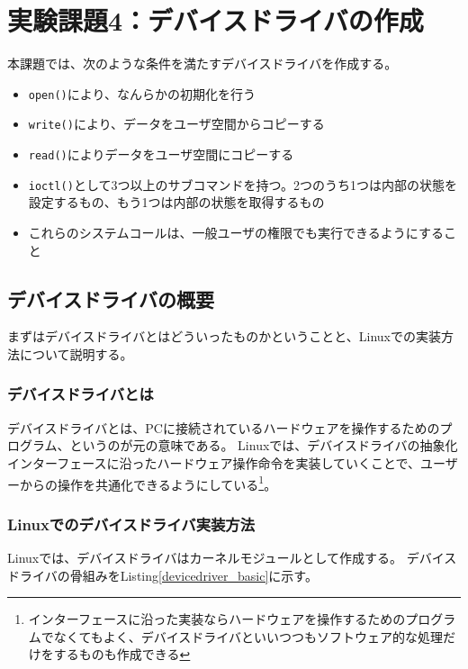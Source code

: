 \documentclass[main]{subfiles}
\begin{document}
\section{実験課題4：デバイスドライバの作成}

本課題では、次のような条件を満たすデバイスドライバを作成する。

\begin{itemize}
 \item \texttt{open()}により、なんらかの初期化を行う
 \item \texttt{write()}により、データをユーザ空間からコピーする
 \item \texttt{read()}によりデータをユーザ空間にコピーする
 \item \texttt{ioctl()}として3つ以上のサブコマンドを持つ。2つのうち1つは内部の状態を設定するもの、もう1つは内部の状態を取得するもの
 \item これらのシステムコールは、一般ユーザの権限でも実行できるようにすること
\end{itemize}

\subsection{デバイスドライバの概要}
\label{intro_devdrv}

まずはデバイスドライバとはどういったものかということと、Linuxでの実装方法について説明する。

\subsubsection{デバイスドライバとは}

デバイスドライバとは、PCに接続されているハードウェアを操作するためのプログラム、というのが元の意味である。
Linuxでは、デバイスドライバの抽象化インターフェースに沿ったハードウェア操作命令を実装していくことで、ユーザーからの操作を共通化できるようにしている\footnote{インターフェースに沿った実装ならハードウェアを操作するためのプログラムでなくてもよく、デバイスドライバといいつつもソフトウェア的な処理だけをするものも作成できる}。

\subsubsection{Linuxでのデバイスドライバ実装方法}

Linuxでは、デバイスドライバはカーネルモジュールとして作成する。
デバイスドライバの骨組みをListing\ref{devicedriver_basic}に示す。
\end{document}
